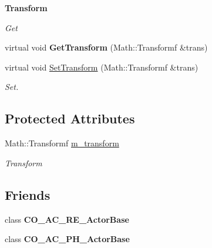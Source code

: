 \begin{Indent}{\bf Transform}\par
{\em \label{_amgrpd032822d6c8e21dab70a2ad76e01ecc9}
 Get }\begin{DoxyCompactItemize}
\item 
\hypertarget{classContent_1_1Actor_1_1Admin_1_1ActorBase_a408daa43e5102de5e97f0f4601e77108}{
virtual void {\bfseries GetTransform} (Math::Transformf \&trans)}
\label{classContent_1_1Actor_1_1Admin_1_1ActorBase_a408daa43e5102de5e97f0f4601e77108}

\item 
\hypertarget{classContent_1_1Actor_1_1Admin_1_1ActorBase_ad8817142e4e6aa7ea73d7928eaa633b3}{
virtual void \hyperlink{classContent_1_1Actor_1_1Admin_1_1ActorBase_ad8817142e4e6aa7ea73d7928eaa633b3}{SetTransform} (Math::Transformf \&trans)}
\label{classContent_1_1Actor_1_1Admin_1_1ActorBase_ad8817142e4e6aa7ea73d7928eaa633b3}

\begin{DoxyCompactList}\small\item\em Set. \item\end{DoxyCompactList}\end{DoxyCompactItemize}
\end{Indent}
\subsection*{Protected Attributes}
\begin{DoxyCompactItemize}
\item 
\hypertarget{classContent_1_1Actor_1_1Admin_1_1ActorBase_a5a25a453d25dfd9a8176cf1a872d2795}{
Math::Transformf \hyperlink{classContent_1_1Actor_1_1Admin_1_1ActorBase_a5a25a453d25dfd9a8176cf1a872d2795}{m\_\-transform}}
\label{classContent_1_1Actor_1_1Admin_1_1ActorBase_a5a25a453d25dfd9a8176cf1a872d2795}

\begin{DoxyCompactList}\small\item\em Transform \item\end{DoxyCompactList}\end{DoxyCompactItemize}
\subsection*{Friends}
\begin{DoxyCompactItemize}
\item 
\hypertarget{classContent_1_1Actor_1_1Admin_1_1ActorBase_a098fcd7920fbf43536f0c01043694765}{
class {\bfseries CO\_\-AC\_\-RE\_\-ActorBase}}
\label{classContent_1_1Actor_1_1Admin_1_1ActorBase_a098fcd7920fbf43536f0c01043694765}

\item 
\hypertarget{classContent_1_1Actor_1_1Admin_1_1ActorBase_a9a1a9ffed4546e30d341990055c8239b}{
class {\bfseries CO\_\-AC\_\-PH\_\-ActorBase}}
\label{classContent_1_1Actor_1_1Admin_1_1ActorBase_a9a1a9ffed4546e30d341990055c8239b}

\end{DoxyCompactItemize}


